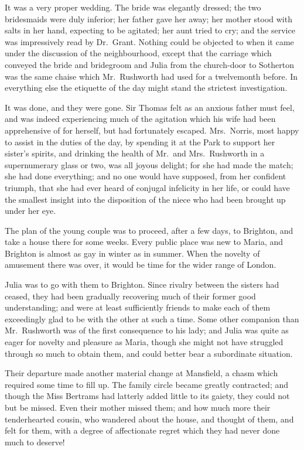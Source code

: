 It was a very proper wedding.  The bride was elegantly dressed;
the two bridesmaids were duly inferior; her father gave
her away; her mother stood with salts in her hand,
expecting to be agitated; her aunt tried to cry;
and the service was impressively read by Dr.\ Grant.
Nothing could be objected to when it came under the
discussion of the neighbourhood, except that the carriage
which conveyed the bride and bridegroom and Julia
from the church-door to Sotherton was the same chaise
which Mr.\ Rushworth had used for a twelvemonth before.
In everything else the etiquette of the day might stand
the strictest investigation.

It was done, and they were gone.  Sir Thomas felt as an
anxious father must feel, and was indeed experiencing much
of the agitation which his wife had been apprehensive
of for herself, but had fortunately escaped.  Mrs.\ Norris,
most happy to assist in the duties of the day,
by spending it at the Park to support her sister's spirits,
and drinking the health of Mr.\ and Mrs.\ Rushworth in
a supernumerary glass or two, was all joyous delight;
for she had made the match; she had done everything;
and no one would have supposed, from her confident triumph,
that she had ever heard of conjugal infelicity in her life,
or could have the smallest insight into the disposition
of the niece who had been brought up under her eye.

The plan of the young couple was to proceed,
after a few days, to Brighton, and take a house there
for some weeks.  Every public place was new to Maria,
and Brighton is almost as gay in winter as in summer.
When the novelty of amusement there was over, it would
be time for the wider range of London.

Julia was to go with them to Brighton.  Since rivalry
between the sisters had ceased, they had been gradually
recovering much of their former good understanding;
and were at least sufficiently friends to make each of them
exceedingly glad to be with the other at such a time.
Some other companion than Mr.\ Rushworth was of the first
consequence to his lady; and Julia was quite as eager
for novelty and pleasure as Maria, though she might not
have struggled through so much to obtain them, and could
better bear a subordinate situation.

Their departure made another material change at Mansfield,
a chasm which required some time to fill up.  The family
circle became greatly contracted; and though the Miss
Bertrams had latterly added little to its gaiety,
they could not but be missed.  Even their mother missed them;
and how much more their tenderhearted cousin, who wandered
about the house, and thought of them, and felt for them,
with a degree of affectionate regret which they had never
done much to deserve!



